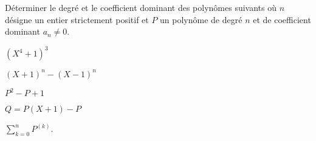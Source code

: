 \documentclass[a4paper, 11pt,reqno]{article}
\begin{document}
\begin{exercice}   \;
	D\'eterminer le degr\'e et le coefficient dominant des polyn\^omes suivants o\`u $n$ d\'esigne un entier strictement positif et $P$ un polyn\^ome de degr\'e $n$ et de coefficient dominant $a_n\not= 0$.
	\begin{enumerate}
		\begin{minipage}[t]{0.45\textwidth}
			\item $(X^4+1)^3$
			\item $(X+1)^n-(X-1)^n$
		\end{minipage}
		\quad
		\begin{minipage}[t]{0.45\textwidth}
			\item $P^2-P+1$
			\item $Q=P(X+1)-P$
			\item $\sum\limits_{k=0}^n P^{(k)}$.
		\end{minipage}
	\end{enumerate}
\end{exercice}
\end{document}
